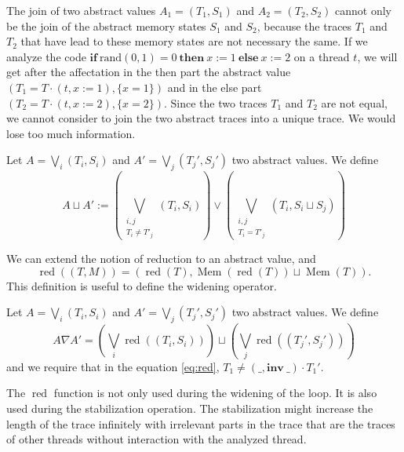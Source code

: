 \documentclass[runningheads]{llncs}
\newcommand{\ifinst}{\mathbf{if}}
\newcommand{\theninst}{\mathbf{then}}
\newcommand{\elseinst}{\mathbf{else}}
\newcommand{\inv}[1]{\mathbf{inv}\ \mathtt{#1}}
\DeclareMathOperator{\red}{red}
\DeclareMathOperator{\Mem}{Mem}
\begin{document}
The join of two abstract values $A_1 = (T_1, S_1)$ and $A_2 = (T_2, S_2)$ cannot only be the join of the abstract memory states $S_1$ and $S_2$, because the traces $T_1$ and $T_2$ that have lead to these memory states are not necessary the same. If we analyze the code $\ifinst\ \mathrm{rand}(0,1) = 0\ \theninst \ x := 1 \ \elseinst \ x :=2$ on a thread $t$, we will get after the affectation in the then part the abstract value $(T_1 = T \cdot (t, x:=1), \{x = 1\})$ and in the else part $(T_2 = T \cdot (t, x:= 2), \{x = 2\})$. Since the two traces $T_1$ and $T_2$ are not equal, we cannot consider to join the two abstract traces into a unique trace. We would lose too much information. 


\begin{definition}[Join]
	Let $A = \bigvee_i (T_i, S_i)$ and $A' = \bigvee_j (T_j', S_j')$ two abstract values. We define
	\[A \sqcup A' := \left(\bigvee_{\substack{i,j\\T_i \neq T'_j}} (T_i, S_i) \right) \vee \left(\bigvee_{\substack{i,j \\ T_i = T'_j}} (T_i, S_i \sqcup S_j) \right)\]
\end{definition}



We can extend the notion of reduction to an abstract value, and \[\red((T, M)) = (\red(T), \Mem(\red(T)) \sqcup \Mem(T)).\] 
This definition is useful to define the widening operator. 


\begin{definition}[Widening]
	Let $A = \bigvee_i (T_i, S_i)$ and $A' = \bigvee_j (T_j', S_j')$ two abstract values. We define 
	\[A \nabla A' = \left(\bigvee_i \red((T_i, S_i))\right) \sqcup \left(\bigvee_j \red((T_j', S_j')) \right)\]
	and we require that in the equation \eqref{eq:red}, $T_1 \neq (\_, \inv{\_}) \cdot T_1'$.
\end{definition}



The $\red$ function is not only used during the widening of the loop. It is also used during the stabilization operation. The stabilization might increase the length of the trace infinitely with irrelevant parts in the trace that are the traces of other threads without interaction with the analyzed thread.





















%
%
\end{document}
